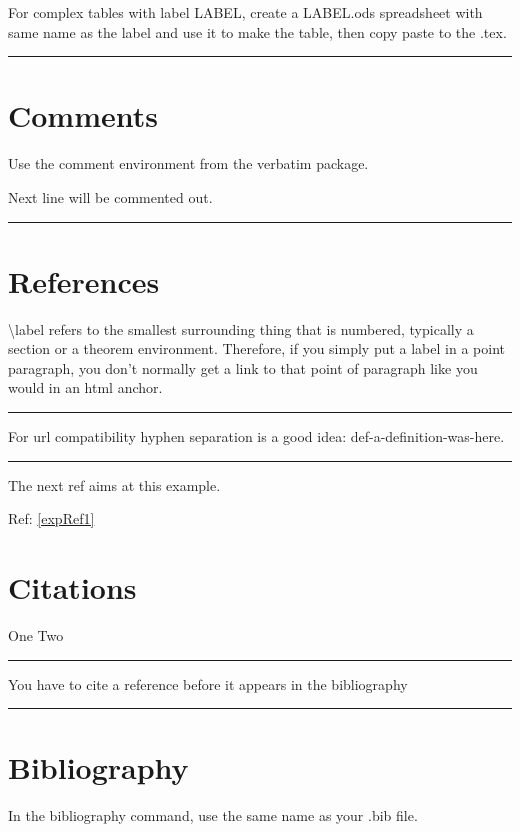 \documentclass[12pt]{article}
\newcommand{\inOut}[1]{#1}
\begin{document}
\begin{remark} \label{remTab2}
  For complex tables with label LABEL, create a LABEL.ods spreadsheet with same name as the label and use it to make the table, then copy paste to the .tex.
\end{remark}\hrule

\section{Comments}

Use the comment environment from the verbatim package.

\begin{example} \label{expCom1}

Next line will be commented out.
\begin{comment}
This line was commented off.
\end{comment}
\end{example}
\hrule

\section{References}

\begin{remark} \label{remLab1}
\textbackslash{}label refers to the smallest surrounding thing that is numbered, typically a section or a theorem environment. Therefore, if you simply put a label in a point paragraph, you don't normally get a link to that point of paragraph like you would in an html anchor.
\end{remark}\hrule

\begin{remark} \label{remLab2}
  For url compatibility hyphen separation is a good idea: def-a-definition-was-here.
\end{remark}\hrule

\begin{example} \label{expRef1}
\inOut{
The next ref aims at this example.

Ref: \ref{expRef1}
}
\end{example}

\section{Citations}

\begin{example} \label{expCite1}
\inOut{One \cite{LL00} Two \cite{LL01}}
\end{example}\hrule

\begin{remark} \label{remCite1}
  You have to cite a reference before it appears in the bibliography
\end{remark}\hrule

\section{Bibliography}

In the bibliography command, use the same name as your .bib file.

\newpage


\end{document}
